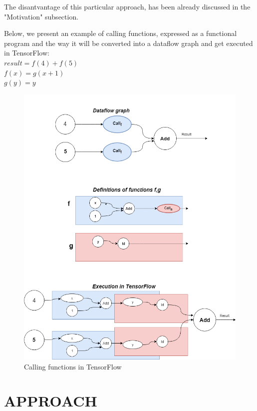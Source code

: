 \documentclass[ack,preface]{dithesis}
\begin{document}
The disantvantage of this particular approach, has been already discussed in the "Motivation" subsection.

\begin{flushleft}
  Below, we present an example of calling functions, expressed as a functional program and the way it will be converted into a dataflow graph and get executed in TensorFlow: \\
 \setlength{\parindent}{25ex} $result = f(4) + f(5)$ \\
$f(x) = g(x+1)$ \\ 
$g(y) = y$
\end{flushleft}


\begin{figure}
\centering
\includegraphics[scale=0.6]{figures/Tf_recursion}
\caption{ Calling functions in TensorFlow}
\end{figure}


\chapter{APPROACH}
\end{document}
